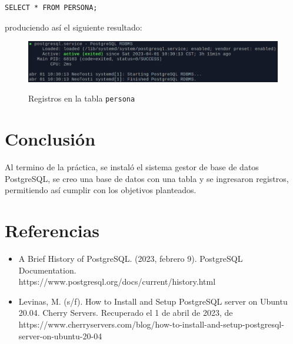 \documentclass[a4paper,12pt]{article}
\begin{document}
\begin{lstlisting}
SELECT * FROM PERSONA;
\end{lstlisting}

produciendo así el siguiente resultado:\\

\begin{figure}[!h]
\centering
	\includegraphics[width=.7\textwidth]{fig1}
	\label{fig6}
	 \caption{Registros en la tabla \texttt{persona}}
\end{figure}

\newpage

\section{Conclusión}

Al termino de la práctica, se instaló el sistema gestor de base de datos PostgreSQL, se creo una base de datos con una tabla y se ingresaron registros, permitiendo así cumplir con los objetivos planteados.\\

\section{Referencias}

\begin{itemize}
\item A Brief History of PostgreSQL. (2023, febrero 9). PostgreSQL Documentation.\\https://www.postgresql.org/docs/current/history.html

\item Levinas, M. (s/f). How to Install and Setup PostgreSQL server on Ubuntu 20.04. Cherry Servers. Recuperado el 1 de abril de 2023, de\\https://www.cherryservers.com/blog/how-to-install-and-setup-postgresql-server-on-ubuntu-20-04
\end{itemize}
\end{document}
